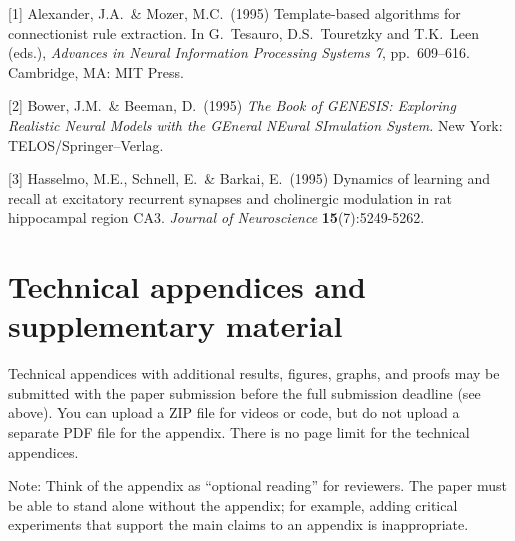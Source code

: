 \documentclass{article}
\begin{document}
{
\small


[1] Alexander, J.A.\ \& Mozer, M.C.\ (1995) Template-based algorithms for
connectionist rule extraction. In G.\ Tesauro, D.S.\ Touretzky and T.K.\ Leen
(eds.), {\it Advances in Neural Information Processing Systems 7},
pp.\ 609--616. Cambridge, MA: MIT Press.


[2] Bower, J.M.\ \& Beeman, D.\ (1995) {\it The Book of GENESIS: Exploring
  Realistic Neural Models with the GEneral NEural SImulation System.}  New York:
TELOS/Springer--Verlag.


[3] Hasselmo, M.E., Schnell, E.\ \& Barkai, E.\ (1995) Dynamics of learning and
recall at excitatory recurrent synapses and cholinergic modulation in rat
hippocampal region CA3. {\it Journal of Neuroscience} {\bf 15}(7):5249-5262.
}



\appendix

\section{Technical appendices and supplementary material}
Technical appendices with additional results, figures, graphs, and proofs may be submitted with the paper submission before the full submission deadline (see above). You can upload a ZIP file for videos or code, but do not upload a separate PDF file for the appendix. There is no page limit for the technical appendices. 

Note: Think of the appendix as ``optional reading'' for reviewers. The paper must be able to stand alone without the appendix; for example, adding critical experiments that support the main claims to an appendix is inappropriate. 


\newpage

\end{document}
